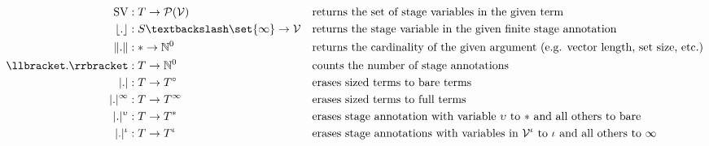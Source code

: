\begin{align*}
\text{SV}             & : T \to \mathcal{P}(\mathcal{V}) && \text{returns the set of stage variables in the given term} \\
\lfloor.\rfloor       & : S \textbackslash \set{\infty} \to \mathcal{V}  && \text{returns the stage variable in the given finite stage annotation} \\
\|.\|                 & : * \to \mathbb{N}^0 && \text{returns the cardinality of the given argument (e.g. vector length, set size, etc.)} \\
\llbracket.\rrbracket & : T \to \mathbb{N}^0 && \text{counts the number of stage annotations} \\
|.|          & : T \to T^\circ  && \text{erases sized terms to bare terms} \\
|.|^\infty   & : T \to T^\infty && \text{erases sized terms to full terms} \\
|.|^\upsilon & : T \to T^*      && \text{erases stage annotation with variable $\upsilon$ to $*$ and all others to bare} \\
|.|^\iota    & : T \to T^\iota  && \text{erases stage annotations with variables in $\mathcal{V}^\iota$ to $\iota$ and all others to $\infty$} \\
\end{align*}